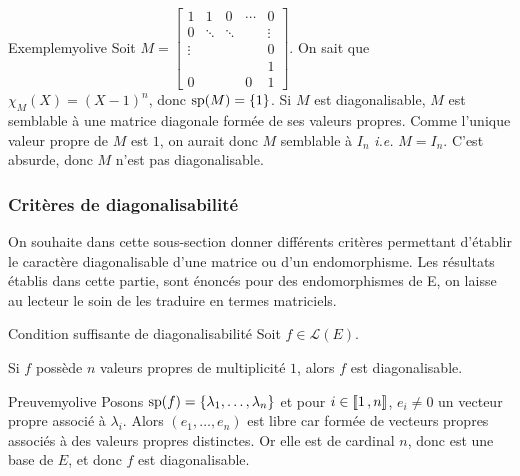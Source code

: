    \begin{omed}{Exemple}{myolive}
        Soit $M = \begin{bmatrix}
            1 & 1 & 0 & \cdots & 0 \\
            0 & \ddots & \ddots & & \vdots \\
            \vdots & & & & 0 \\
            & & & & 1 \\
            0 & & & 0 & 1
        \end{bmatrix}$. On sait que $\chi_M(X) = (X-1)^n$, donc $\sp(M) = \left\{1\right\}$. Si $M$ est diagonalisable, $M$ est semblable à une matrice diagonale formée de ses valeurs propres. Comme l’unique valeur propre de $M$ est $1$, on aurait donc $M$ semblable à $I_n$ \textit{i.e.} $M = I_n$. C’est absurde, donc $M$ n’est pas diagonalisable.
    \end{omed}

    \subsubsection{Critères de diagonalisabilité}

    On souhaite dans cette sous-section donner diﬀérents critères permettant d’établir le caractère diagonalisable d’une matrice ou d’un endomorphisme. Les résultats établis dans cette partie, sont énoncés pour des endomorphismes de E, on laisse au lecteur le soin de les traduire en termes matriciels.

    \begin{prop}{Condition suffisante de diagonalisabilité}{}
        Soit $f \in \mathcal{L}(E)$.

        Si $f$ possède $n$ valeurs propres de multiplicité $1$, alors $f$ est diagonalisable.
    \end{prop}

    \begin{demo}{Preuve}{myolive}
        Posons $\sp(f) = \left\{\lambda_1,\ldots,\lambda_n\right\}$ et pour $i \in \intervalleEntier{1}{n}$, $e_i \neq 0$ un vecteur propre associé à $\lambda_i$. Alors $(e_1,\ldots,e_n)$ est libre car formée de vecteurs propres associés à des valeurs propres distinctes. Or elle est de cardinal $n$, donc est une base de $E$, et donc $f$ est diagonalisable. 
    \end{demo}

